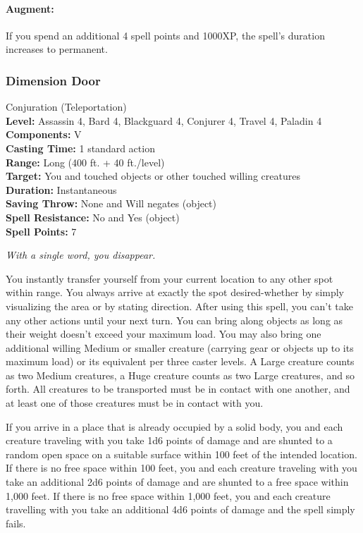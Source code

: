 \paragraph{Augment:} If you spend an additional 4 spell points and 1000XP, the spell's duration increases to permanent.
\subsubsection{Dimension Door}
\label{Spell:DimensionDoor}
Conjuration (Teleportation)
\\ \textbf{Level:} Assassin 4, Bard 4, Blackguard 4, Conjurer 4, Travel 4, Paladin 4
\\ \textbf{Components:} V
\\ \textbf{Casting Time:} 1 standard action
\\ \textbf{Range:} Long (400 ft. + 40 ft./level)
\\ \textbf{Target:} You and touched objects or other touched willing creatures
\\ \textbf{Duration:} Instantaneous
\\ \textbf{Saving Throw:} None and Will negates (object)
\\ \textbf{Spell Resistance:} No and Yes (object)
\\ \textbf{Spell Points:} 7

\emph{With a single word, you disappear.}

You instantly transfer yourself from your current location to any other spot within range.
You always arrive at exactly the spot desired-whether by simply visualizing the area or by stating direction. 
After using this spell, you can't take any other actions until your next turn. 
You can bring along objects as long as their weight doesn't exceed your maximum load. 
You may also bring one additional willing Medium or smaller creature (carrying gear or objects up to its maximum load) 
or its equivalent per three caster levels. 
A Large creature counts as two Medium creatures, a Huge creature counts as two Large creatures, and so forth. 
All creatures to be transported must be in contact with one another, 
and at least one of those creatures must be in contact with you.

If you arrive in a place that is already occupied by a solid body, 
you and each creature traveling with you take 1d6 points of damage and 
are shunted to a random open space on a suitable surface within 100 feet of the intended location.
If there is no free space within 100 feet, you and each creature traveling with you take an additional 
2d6 points of damage and are shunted to a free space within 1,000 feet. 
If there is no free space within 1,000 feet, 
you and each creature travelling with you take an additional 4d6 points of damage and the spell simply fails.

